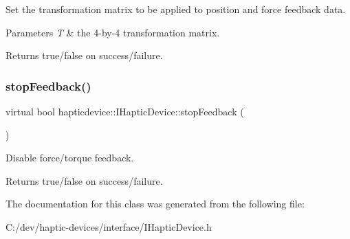 Set the transformation matrix to be applied to position and force feedback data. 


\begin{DoxyParams}{Parameters}
{\em T} & the 4-\/by-\/4 transformation matrix. \\
\hline
\end{DoxyParams}
\begin{DoxyReturn}{Returns}
true/false on success/failure. 
\end{DoxyReturn}
\label{classhapticdevice_1_1IHapticDevice_a65fccacec1cfa0208c8952f7063a7b6b} 
\subsubsection{\texorpdfstring{stop\+Feedback()}{stopFeedback()}}
{\footnotesize\ttfamily virtual bool hapticdevice\+::\+I\+Haptic\+Device\+::stop\+Feedback (\begin{DoxyParamCaption}{ }\end{DoxyParamCaption})\hspace{0.3cm}{\ttfamily [pure virtual]}}



Disable force/torque feedback. 

\begin{DoxyReturn}{Returns}
true/false on success/failure. 
\end{DoxyReturn}


The documentation for this class was generated from the following file\+:\begin{DoxyCompactItemize}
\item 
C\+:/dev/haptic-\/devices/interface/I\+Haptic\+Device.\+h\end{DoxyCompactItemize}
